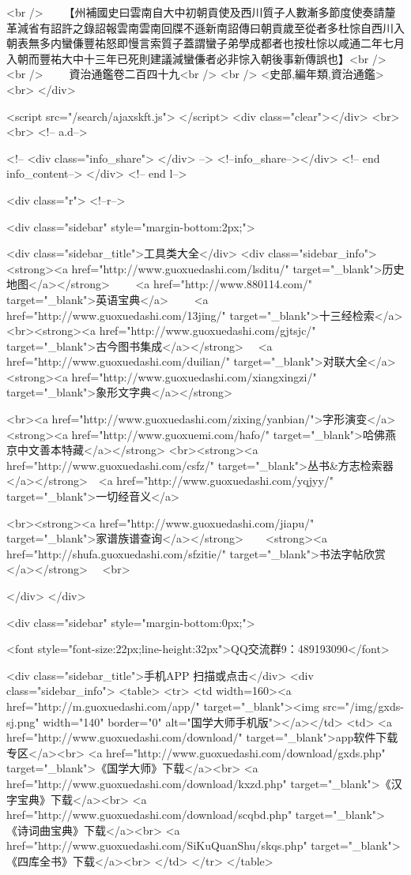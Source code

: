 <br />
　　【州補國史曰雲南自大中初朝貢使及西川質子人數漸多節度使奏請釐革減省有詔許之錄詔報雲南雲南回牒不遜新南詔傳曰朝貢歲至從者多杜悰自西川入朝表無多内蠻傔豐祐怒即慢言索質子蓋謂蠻子弟學成都者也按杜悰以咸通二年七月入朝而豐祐大中十三年已死則建議減蠻傔者必非悰入朝後事新傳誤也】<br />
<br />
　　資治通鑑卷二百四十九<br />
<br />
<史部,編年類,資治通鑑>  <br>
   </div> 

<script src="/search/ajaxskft.js"> </script>
 <div class="clear"></div>
<br>
<br>
 <!-- a.d-->

 <!--
<div class="info_share">
</div> 
-->
 <!--info_share--></div>   <!-- end info_content-->
  </div> <!-- end l-->

<div class="r">   <!--r-->



<div class="sidebar"  style="margin-bottom:2px;">

 
<div class="sidebar_title">工具类大全</div>
<div class="sidebar_info">
<strong><a href="http://www.guoxuedashi.com/lsditu/" target="_blank">历史地图</a></strong>　　
<a href="http://www.880114.com/" target="_blank">英语宝典</a>　　
<a href="http://www.guoxuedashi.com/13jing/" target="_blank">十三经检索</a>　
<br><strong><a href="http://www.guoxuedashi.com/gjtsjc/" target="_blank">古今图书集成</a></strong>　
<a href="http://www.guoxuedashi.com/duilian/" target="_blank">对联大全</a>　<strong><a href="http://www.guoxuedashi.com/xiangxingzi/" target="_blank">象形文字典</a></strong>　

<br><a href="http://www.guoxuedashi.com/zixing/yanbian/">字形演变</a>　　<strong><a href="http://www.guoxuemi.com/hafo/" target="_blank">哈佛燕京中文善本特藏</a></strong>
<br><strong><a href="http://www.guoxuedashi.com/csfz/" target="_blank">丛书&方志检索器</a></strong>　<a href="http://www.guoxuedashi.com/yqjyy/" target="_blank">一切经音义</a>　　

<br><strong><a href="http://www.guoxuedashi.com/jiapu/" target="_blank">家谱族谱查询</a></strong>　　<strong><a href="http://shufa.guoxuedashi.com/sfzitie/" target="_blank">书法字帖欣赏</a></strong>　
<br>

</div>
</div>


<div class="sidebar" style="margin-bottom:0px;">

<font style="font-size:22px;line-height:32px">QQ交流群9：489193090</font>


<div class="sidebar_title">手机APP 扫描或点击</div>
<div class="sidebar_info">
<table>
<tr>
	<td width=160><a href="http://m.guoxuedashi.com/app/" target="_blank"><img src="/img/gxds-sj.png" width="140"  border="0" alt="国学大师手机版"></a></td>
	<td>
<a href="http://www.guoxuedashi.com/download/" target="_blank">app软件下载专区</a><br>
<a href="http://www.guoxuedashi.com/download/gxds.php" target="_blank">《国学大师》下载</a><br>
<a href="http://www.guoxuedashi.com/download/kxzd.php" target="_blank">《汉字宝典》下载</a><br>
<a href="http://www.guoxuedashi.com/download/scqbd.php" target="_blank">《诗词曲宝典》下载</a><br>
<a href="http://www.guoxuedashi.com/SiKuQuanShu/skqs.php" target="_blank">《四库全书》下载</a><br>
</td>
</tr>
</table>

